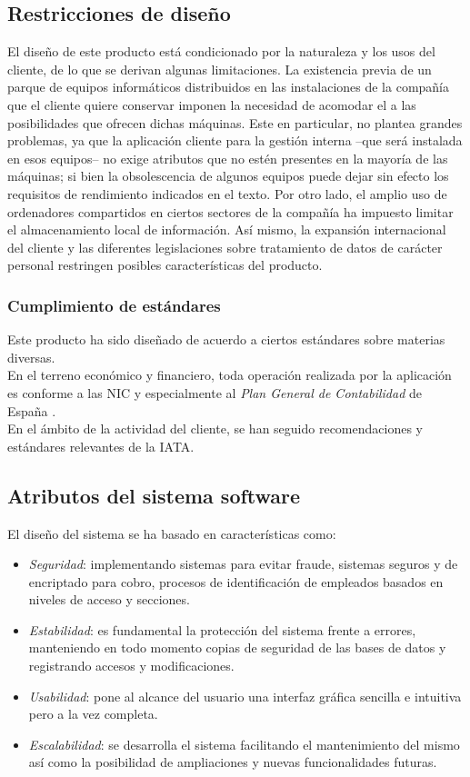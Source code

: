 \documentclass[11pt, a4paper, twoside]{report}
\begin{document}
		\subsection{Restricciones de diseño}
			El diseño de este producto está condicionado por la naturaleza y los usos del cliente, de lo que se derivan algunas limitaciones. La existencia previa de un parque de equipos informáticos distribuidos en las instalaciones de la compañía que el cliente quiere conservar imponen la necesidad de acomodar el \software a las posibilidades que ofrecen dichas máquinas. Este en particular, no plantea grandes problemas, ya que la aplicación cliente para la gestión interna --que será instalada en esos equipos-- no exige atributos que no estén presentes en la mayoría de las máquinas; si bien la obsolescencia de algunos equipos puede dejar sin efecto los requisitos de rendimiento indicados en el texto. Por otro lado, el amplio uso de ordenadores compartidos en ciertos sectores de la compañía ha impuesto limitar el almacenamiento local de información. Así mismo, la expansión internacional del cliente y las diferentes legislaciones sobre tratamiento de datos de carácter personal restringen posibles características del producto.
			\subsubsection{Cumplimiento de estándares}
				Este producto ha sido diseñado de acuerdo a ciertos estándares sobre materias diversas.\\
				
				En el terreno económico y financiero, toda operación realizada por la aplicación es conforme a las \gls{NIC} \cite{NIC2006} y especialmente al \textit{Plan General de Contabilidad} de España \cite{PGC2007}.\\

				En el ámbito de la actividad del cliente, se han seguido recomendaciones y estándares relevantes de la \gls{IATA}.
				
		\subsection{Atributos del sistema software}
			El diseño del sistema se ha basado en características como:
			\begin{itemize}
				\item \textit{Seguridad}: implementando sistemas para evitar fraude, sistemas seguros y de encriptado para cobro, procesos de identificación de empleados basados en niveles de acceso y secciones.
				\item \textit{Estabilidad}: es fundamental la protección del sistema frente a errores, manteniendo en todo momento copias de seguridad de las bases de datos y registrando accesos y modificaciones.
				\item \textit{\gls{Usabilidad}}: pone al alcance del usuario una interfaz gráfica sencilla e intuitiva pero a la vez completa.
				\item \textit{Escalabilidad}: se desarrolla el sistema facilitando el mantenimiento del mismo así como la posibilidad de ampliaciones y nuevas funcionalidades futuras.
			\end{itemize}
	
\end{document}
